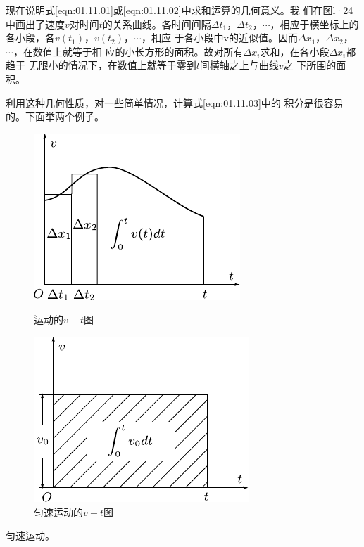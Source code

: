     现在说明式\eqref{eqn:01.11.01}或\eqref{eqn:01.11.02}中求和运算的几何意义。我
们在图l·24 中画出了速度$v$对时间$t$的关系曲线。各时间间隔$\Delta t_1$，$\Delta t_2$，$\cdots$，相应于横坐标上的各小段，各$v(t_1)$，$v(t_2)$，$\cdots$，相应
于各小段中v的近似值。因而$\Delta x_1$，$\Delta x_2$，$\cdots$，在数值上就等于相
应的小长方形的面积。故对所有$\Delta x_i$求和，在各小段$\Delta x_i$都趋于
无限小的情况下，在数值上就等于零到$t$间横轴之上与曲线$v$之
下所围的面积。

    利用这种几何性质，对一些简单情况，计算式\eqref{eqn:01.11.03}中的
积分是很容易的。下面举两个例子。
\begin{figure}[!h]
    \begin{minipage}[b]{14em}
        \centering
        \includegraphics{figure/fig01.24.pdf}
        \caption{运动的$v-t$图}
        \label{fig:01.24}
    \end{minipage}\hfill
    \begin{minipage}[b]{14em}
        \centering
        \includegraphics{figure/fig01.25.pdf}
        \caption{匀速运动的$v-t$图}
        \label{fig:01.25}
    \end{minipage}
\end{figure}

\example 匀速运动。

